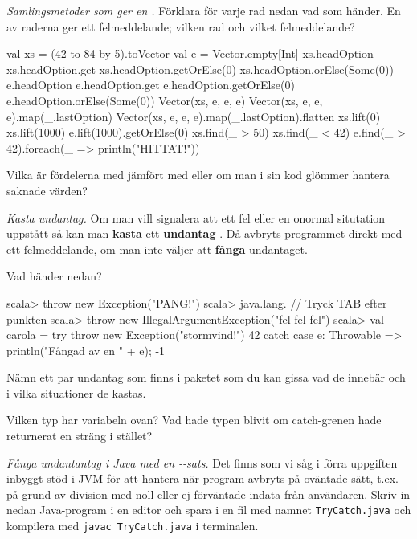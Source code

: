 \Subtask \emph{Samlingsmetoder som ger en .} Förklara för varje rad nedan vad som händer. En av raderna ger ett felmeddelande; vilken rad och vilket felmeddelande?
\begin{REPL}
val xs = (42 to 84 by 5).toVector
val e = Vector.empty[Int]
xs.headOption
xs.headOption.get
xs.headOption.getOrElse(0)
xs.headOption.orElse(Some(0))
e.headOption
e.headOption.get
e.headOption.getOrElse(0)
e.headOption.orElse(Some(0))
Vector(xs, e, e, e)
Vector(xs, e, e, e).map(_.lastOption)
Vector(xs, e, e, e).map(_.lastOption).flatten
xs.lift(0)
xs.lift(1000)
e.lift(1000).getOrElse(0)
xs.find(_ > 50)
xs.find(_ < 42)
e.find(_ > 42).foreach(_ => println("HITTAT!"))
\end{REPL}

\Subtask\Pen Vilka är fördelerna med  jämfört med  eller  om man i sin kod glömmer hantera saknade värden?

\Task \emph{Kasta undantag.} Om man vill signalera att ett fel eller en onormal situtation uppstått så kan man \textbf{kasta}  ett \textbf{undantag} . Då avbryts programmet direkt med ett felmeddelande, om man inte väljer att \textbf{fånga}  undantaget. 

\Subtask Vad händer nedan?
\begin{REPL}
scala> throw new Exception("PANG!")
scala> java.lang.   // Tryck TAB efter punkten
scala> throw new IllegalArgumentException("fel fel fel")
scala> val carola = try { 
         throw new Exception("stormvind!") 
         42
       } catch { case e: Throwable => println("Fångad av en " + e); -1 } 
\end{REPL}
\Subtask\Pen Nämn ett par undantag som finns i paketet  som du kan gissa vad de innebär och i vilka situationer de kastas.

\Subtask\Pen Vilken typ har variabeln  ovan? Vad hade typen blivit om catch-grenen hade returnerat en sträng i stället?

\Task \label{task:javatry} \emph{Fånga undantantag i Java med en --sats.} Det finns som vi såg i förra uppgiften inbyggt stöd i JVM för att hantera när program avbryts på oväntade sätt, t.ex. på grund av division med noll eller ej förväntade indata från användaren. Skriv in nedan Java-program i en editor och spara i en fil med namnet \texttt{TryCatch.java} och kompilera med \texttt{javac TryCatch.java} i terminalen. 


